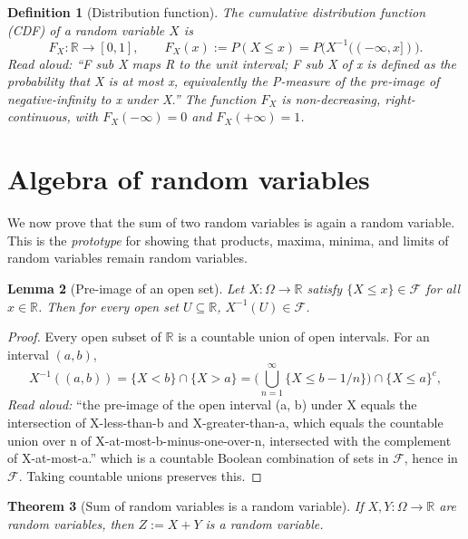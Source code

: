 \documentclass[11pt]{article}
\newtheorem{theorem}{Theorem}
\newtheorem{definition}[theorem]{Definition}
\newtheorem{lemma}[theorem]{Lemma}
\begin{document}
\begin{definition}[Distribution function]
The \emph{cumulative distribution function} (CDF) of a random variable $X$ is
\[
   F_X : \mathbb{R} \to [0,1], \qquad F_X(x) := P(X \le x) = P\big(X^{-1}((-\infty, x])\big).
\]
\emph{Read aloud:} ``F sub X maps R to the unit interval; F sub X of x is defined as the probability that X is at most x, equivalently the P-measure of the pre-image of negative-infinity to x under X.''
The function $F_X$ is non-decreasing, right-continuous, with $F_X(-\infty)=0$ and $F_X(+\infty)=1$.
\end{definition}

\section{Algebra of random variables}

We now prove that the sum of two random variables is again a random variable. This is the
\emph{prototype} for showing that products, maxima, minima, and limits of random variables
remain random variables.

\begin{lemma}[Pre-image of an open set]\label{lem:open}
Let $X : \Omega \to \mathbb{R}$ satisfy $\{X \le x\} \in \mathcal{F}$ for all $x \in \mathbb{R}$.
Then for every open set $U \subseteq \mathbb{R}$, $X^{-1}(U) \in \mathcal{F}$.
\end{lemma}

\begin{proof}
Every open subset of $\mathbb{R}$ is a countable union of open intervals. For an interval $(a,b)$,
\[
   X^{-1}((a,b)) = \{X < b\} \cap \{X > a\} = \Big(\bigcup_{n=1}^\infty \{X \le b - 1/n\}\Big) \cap \{X \le a\}^c,
\]
\emph{Read aloud:} ``the pre-image of the open interval (a, b) under X equals the intersection of X-less-than-b and X-greater-than-a, which equals the countable union over n of X-at-most-b-minus-one-over-n, intersected with the complement of X-at-most-a.''
which is a countable Boolean combination of sets in $\mathcal{F}$, hence in $\mathcal{F}$. Taking
countable unions preserves this.
\end{proof}

\begin{theorem}[Sum of random variables is a random variable]
If $X, Y : \Omega \to \mathbb{R}$ are random variables, then $Z := X + Y$ is a random variable.
\end{theorem}
\end{document}
